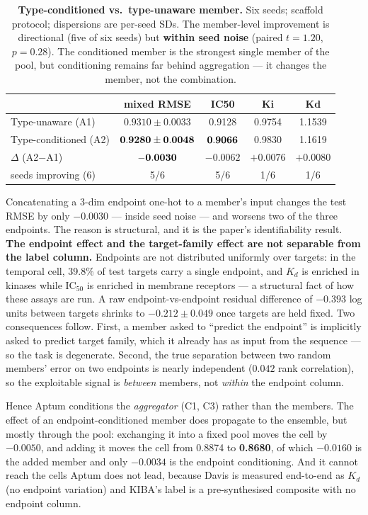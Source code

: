 \documentclass[10pt,letterpaper]{article}
\newcommand{\best}[1]{\ifmmode\mathbf{#1}\else\textbf{#1}\fi}
\begin{document}
\begin{table}[htbp]
\centering
\small
\caption{\textbf{Type-conditioned vs.\ type-unaware member.} Six seeds; scaffold
protocol; dispersions are per-seed SDs. The member-level improvement is directional
(five of six seeds) but \textbf{within seed noise} (paired $t=1.20$, $p=0.28$). The
conditioned member is the strongest single member of the pool, but conditioning
remains far behind aggregation --- it changes the member, not the combination.}
\label{tab:type}
\begin{tabular*}{\linewidth}{@{\extracolsep{\fill}}@{}lcccc@{}}
\toprule
 & mixed RMSE & IC50 & Ki & Kd \\
\midrule
Type-unaware (A1)     & $0.9310 \pm 0.0033$ & 0.9128 & 0.9754 & 1.1539 \\
Type-conditioned (A2) & $\best{0.9280 \pm 0.0048}$ & $\best{0.9066}$ & 0.9830 & 1.1619 \\
$\Delta$ (A2$-$A1)    & $\best{-0.0030}$ & $-0.0062$ & $+0.0076$ & $+0.0080$ \\
seeds improving (6)   & 5/6 & 5/6 & 1/6 & 1/6 \\
\bottomrule
\end{tabular*}
\end{table}

Concatenating a 3-dim endpoint one-hot to a member's input changes the test RMSE by
only $-0.0030$ --- inside seed noise --- and worsens two of the three endpoints. The
reason is structural, and it is the paper's identifiability result. \textbf{The
endpoint effect and the target-family effect are not separable from the label
column.} Endpoints are not distributed uniformly over targets: in the temporal cell,
39.8\% of test targets carry a single endpoint, and $K_d$ is enriched in kinases while
IC$_{50}$ is enriched in membrane receptors --- a structural fact of how these assays
are run. A raw endpoint-vs-endpoint residual difference of $-0.393$ log units between
targets shrinks to $-0.212 \pm 0.049$ once targets are held fixed. Two consequences
follow. First, a member asked to ``predict the endpoint'' is implicitly asked to
predict target family, which it already has as input from the sequence --- so the
task is degenerate. Second, the true separation between two random members' error on
two endpoints is nearly independent ($0.042$ rank correlation), so the exploitable
signal is \emph{between} members, not \emph{within} the endpoint column.

Hence Aptum conditions the \emph{aggregator} (C1, C3) rather than the members. The
effect of an endpoint-conditioned member does propagate to the ensemble, but mostly
through the pool: exchanging it into a fixed pool moves the cell by $-0.0050$, and
adding it moves the cell from 0.8874 to \best{0.8680}, of which $-0.0160$ is the added
member and only $-0.0034$ is the endpoint conditioning. And it cannot reach the cells
Aptum does not lead, because Davis is measured end-to-end as $K_d$ (no endpoint
variation) and KIBA's label is a pre-synthesised composite with no endpoint column.
\end{document}
